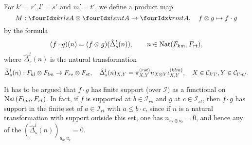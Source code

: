 
\begin{Def} For $k'=r', l'=s'$ and $m'=t'$, we define a product map \[M:\Gr{A}{k}{l}{r}{s} \otimes \Gr{A}{l}{m}{s}{t}\rightarrow  \Gr{A}{k}{m}{r}{t},\quad f\otimes g \mapsto f\cdot g\] by the formula \[(f\cdot g)(n) = (f\otimes g)( \hat{\Delta}^{l}_{s}(n)), \qquad  n \in \operatorname{\mathrm{Nat}}(F_{km},F_{rt}),\] where $\hat{\Delta}^l_s(n)$ is the natural transformation\[\hat{\Delta}^l_s(n):  F_{kl}\otimes F_{lm}\rightarrow F_{rs}\otimes F_{st},\quad \hat{\Delta}^l_s(n)_{X,Y} = \pi^{(rst)}_{X,Y}n_{X\otimes Y} \iota^{(klm)}_{X,Y},\quad X\in \mathcal{C}_{k'l'},Y\in \mathcal{C}_{l'm'}.\]
\end{Def}

\begin{Rem} It has to be argued that $f\cdot g$ has finite support (over $\mathcal{I})$ as a functional on $\operatorname{\mathrm{Nat}}(F_{km},F_{rt})$. In fact, if $f$ is supported at $b\in \mathcal{I}_{rs}$ and $g$ at $c\in \mathcal{I}_{st}$, then $f\cdot g$ has support in the finite set of $a\in \mathcal{I}_{rt}$ with $a\leq b\cdot c$, since if $n$ is a natural transformation with support outside this set, one has $n_{u_b\otimes u_c}=0$, and hence any of the $\left(\hat{\Delta}^l_s(n)\right)_{u_b,u_c} =0$.
\end{Rem}

